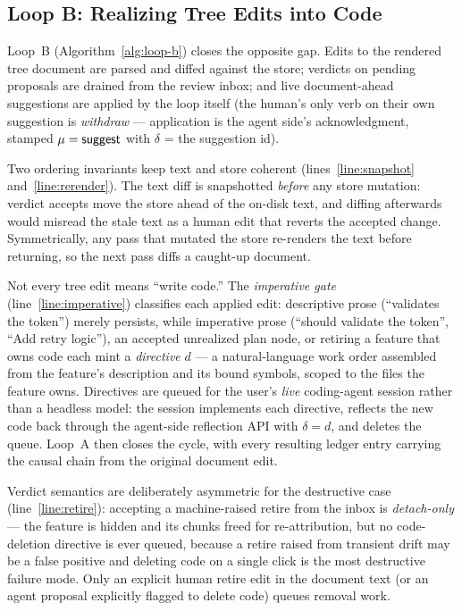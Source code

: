 \subsection{Loop B: Realizing Tree Edits into Code}
\label{sec:loop-b}

Loop~B (Algorithm~\ref{alg:loop-b}) closes the opposite gap. Edits to the
rendered tree document are parsed and diffed against the store; verdicts on
pending proposals are drained from the review inbox; and live document-ahead
suggestions are applied by the loop itself (the human's only verb on their own
suggestion is \emph{withdraw} --- application is the agent side's
acknowledgment, stamped $\mu = \textsf{suggest}$ with $\delta$ = the suggestion id).

Two ordering invariants keep text and store coherent
(lines~\ref{line:snapshot} and~\ref{line:rerender}). The text diff is
snapshotted \emph{before} any store mutation: verdict accepts move the store
ahead of the on-disk text, and diffing afterwards would misread the stale text
as a human edit that reverts the accepted change. Symmetrically, any pass that
mutated the store re-renders the text before returning, so the next pass diffs
a caught-up document.

Not every tree edit means ``write code.'' The \emph{imperative gate}
(line~\ref{line:imperative}) classifies each applied edit: descriptive prose
(``validates the token'') merely persists, while imperative prose (``should
validate the token'', ``Add retry logic''), an accepted unrealized plan node,
or retiring a feature that owns code each mint a \emph{directive} $d$ --- a
natural-language work order assembled from the feature's description and its
bound symbols, scoped to the files the feature owns. Directives are queued for
the user's \emph{live} coding-agent session rather than a headless model: the
session implements each directive, reflects the new code back through the
agent-side reflection API with $\delta = d$, and deletes the queue. Loop~A
then closes the cycle, with every resulting ledger entry carrying the causal
chain from the original document edit.

Verdict semantics are deliberately asymmetric for the destructive case
(line~\ref{line:retire}): accepting a machine-raised \textsf{retire} from the
inbox is \emph{detach-only} --- the feature is hidden and its chunks freed for
re-attribution, but no code-deletion directive is ever queued, because a retire
raised from transient drift may be a false positive and deleting code on a
single click is the most destructive failure mode. Only an explicit human
retire edit in the document text (or an agent proposal explicitly flagged to
delete code) queues removal work.

